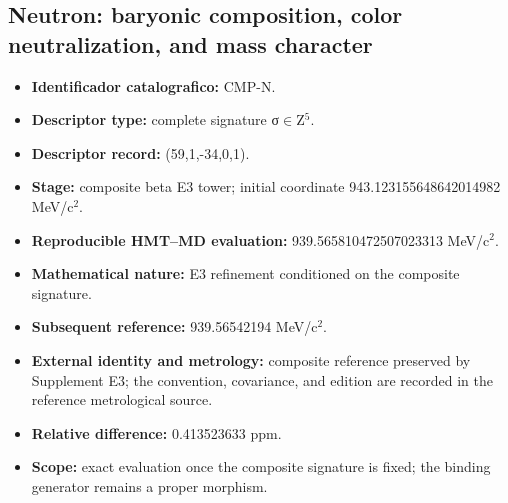 \subsection{Neutron: baryonic composition, color neutralization, and mass character}
\begin{itemize}
\item \textbf{Identificador catalografico:} CMP-N.
\item \textbf{Descriptor type:} complete signature σ\(\in\)Z\({}^{5}\).
\item \textbf{Descriptor record:} (59,1,-34,0,1).
\item \textbf{Stage:} composite beta E3 tower; initial coordinate 943.123155\allowbreak{}648642\allowbreak{}014982 MeV/c\({}^{2}\).
\item \textbf{Reproducible HMT--MD evaluation:} 939.565810\allowbreak{}472507\allowbreak{}023313 MeV/c\({}^{2}\).
\item \textbf{Mathematical nature:} E3 refinement conditioned on the composite signature.
\item \textbf{Subsequent reference:} 939.565421\allowbreak{}94 MeV/c\({}^{2}\).
\item \textbf{External identity and metrology:} composite reference preserved by Supplement E3; the convention, covariance, and edition are recorded in the reference metrological source.
\item \textbf{Relative difference:} 0.413523\allowbreak{}633 ppm.
\item \textbf{Scope:} exact evaluation once the composite signature is fixed; the binding generator remains a proper morphism.
\end{itemize}
\endinput
\clearpage
